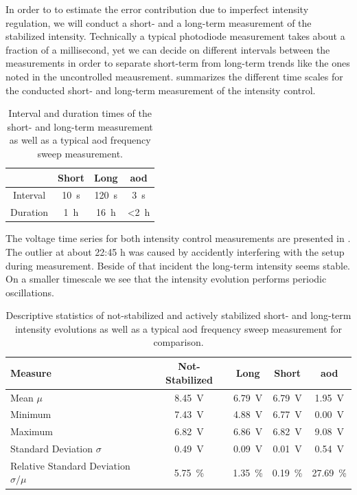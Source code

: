 In order to to estimate the error contribution due to imperfect intensity
regulation, we will conduct a short- and a long-term measurement of the
stabilized intensity. Technically a typical photodiode measurement takes about
a fraction of a millisecond, yet we can decide on different intervals between
the measurements in order to separate short-term from long-term trends like
the ones noted in the uncontrolled meausrement.
 summarizes the different time scales for
the conducted short- and long-term measurement of the intensity control.
\begin{table}[htb]
  \centering
  \begin{tabular}{cccc}
    \toprule
    & Short & Long & \gls{aod} \\
    \midrule
    Interval &
    \SI{10}{\second} &
    \SI{120}{\second} &
    \SI{3}{\second} \\
    Duration &
    \SI{1}{\hour} &
    \SI{16}{\hour} &
    \SI{<2}{\hour} \\
    \bottomrule
  \end{tabular}
  \caption{Interval and duration times of the short- and long-term measurement
    as well as a typical \gls{aod} frequency sweep measurement.
  }\label{tab:intensity_control_times}
\end{table}
The voltage time series for both intensity control measurements are presented
in . The outlier at about 22:45 h was caused by
accidently interfering with the setup during measurement. Beside of that
incident the long-term intensity seems stable. On a smaller timescale we see
that the intensity evolution performs periodic oscillations.
\begin{table}[htb]
  \centering
  \begin{tabular}{lcccc}
    \toprule
    Measure & Not-Stabilized & Long & Short & \gls{aod} \\
    \midrule
    Mean $\mu$ &
    \SI{8.45}{\volt} &
    \SI{6.79}{\volt} &
    \SI{6.79}{\volt} &
    \SI{1.95}{\volt} \\
    Minimum &
    \SI{7.43}{\volt} &
    \SI{4.88}{\volt} &
    \SI{6.77}{\volt} &
    \SI{0.00}{\volt} \\
    Maximum &
    \SI{6.82}{\volt} &
    \SI{6.86}{\volt} &
    \SI{6.82}{\volt} &
    \SI{9.08}{\volt} \\
    Standard Deviation $\sigma$ &
    \SI{0.49}{\volt} &
    \SI{0.09}{\volt} &
    \SI{0.01}{\volt} &
    \SI{0.54}{\volt} \\
    Relative Standard Deviation $\sigma/\mu$ &
    \SI{5.75}{\percent} &
    \SI{1.35}{\percent} &
    \SI{0.19}{\percent} &
    \SI{27.69}{\percent} \\
    \bottomrule
  \end{tabular}
  \caption{Descriptive statistics of not-stabilized and actively stabilized
    short- and long-term intensity evolutions as well as a typical \gls{aod}
    frequency sweep measurement for comparison.
  }\label{tab:intensity_control_statistics}
\end{table}
